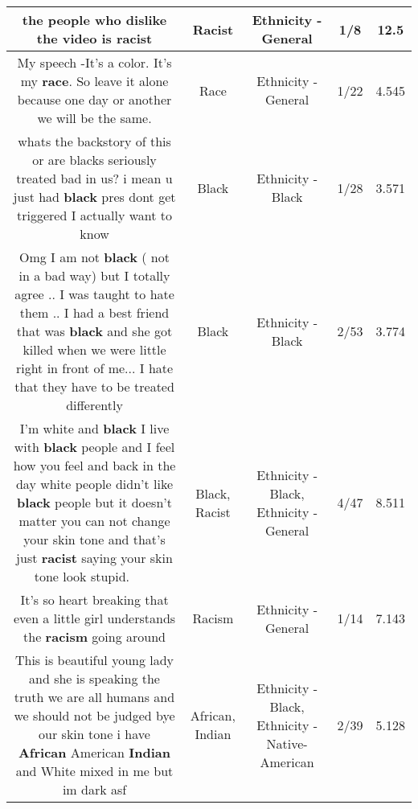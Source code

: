 \documentclass[11pt]{article}
\newlength\mylength
\begin{document}
\begin{center}
\begin{longtable}{|C{.65\mylength}|C{.30\mylength}|C{.12\mylength}|C{.12\mylength}|C{.12\mylength}|}
  \small the people who dislike the video is racist\normalsize   & Racist & Ethnicity - General & 1/8 & 12.5 \\  \hline
  \small My speech -It's a color. It's my \textbf{race}. So leave it alone because one day or another we will be the same.\normalsize   & Race & Ethnicity - General & 1/22 & 4.545 \\  \hline
  \small whats the backstory of this or are blacks seriously treated bad in us? i mean u just had \textbf{black} pres dont get triggered I actually want to know\normalsize   & Black & Ethnicity - Black & 1/28 & 3.571 \\  \hline
  \small Omg I am not \textbf{black} ( not in a bad way) but I totally agree .. I was taught to hate them .. I had a best friend that was \textbf{black} and she got killed when we were little right in front of me... I hate that they have to be treated differently\normalsize   & Black & Ethnicity - Black & 2/53 & 3.774 \\  \hline
  \small I'm white and \textbf{black} I live with \textbf{black} people and I feel how you feel and back in the day white people didn't like \textbf{black} people but it doesn't matter you can not change your skin tone and that's just \textbf{racist} saying your skin tone look stupid.😤😧😦😩🙁😯😔\normalsize   & Black, Racist & Ethnicity - Black, Ethnicity - General & 4/47 & 8.511 \\  \hline
  \small It's so heart breaking that even a little girl understands the \textbf{racism} going around\normalsize   & Racism & Ethnicity - General & 1/14 & 7.143 \\  \hline
  \small This is beautiful young lady and she is speaking the truth we are all humans and we should not be judged bye our skin tone i have \textbf{African} American \textbf{Indian} and White mixed in me but im dark asf\normalsize   & African, Indian & Ethnicity - Black, Ethnicity - Native-American & 2/39 & 5.128 \\  \hline

\end{longtable}
\end{center}
\end{document}
